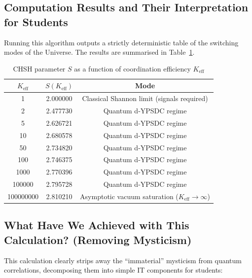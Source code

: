 \documentclass[12pt,a4paper]{article}
\begin{document}
	\subsection{Computation Results and Their Interpretation for Students}
	
	Running this algorithm outputs a strictly deterministic table of the switching modes of the Universe. The results are summarised in Table~\ref{tab:bell_yuct}.
	
	\begin{table}[htbp]
		\centering
		\small
		\setlength{\tabcolsep}{4pt}
		\caption{CHSH parameter \(S\) as a function of coordination efficiency \(K_{\mathrm{eff}}\)}
		\label{tab:bell_yuct}
		\begin{tabular}{ccc}
			\toprule
			\(K_{\mathrm{eff}}\) & \(S(K_{\mathrm{eff}})\) & Mode \\
			\midrule
			1            & 2.000000 & Classical Shannon limit (signals required) \\
			2            & 2.477730 & Quantum d‑YPSDC regime \\
			5            & 2.626721 & Quantum d‑YPSDC regime \\
			10           & 2.680578 & Quantum d‑YPSDC regime \\
			50           & 2.734820 & Quantum d‑YPSDC regime \\
			100          & 2.746375 & Quantum d‑YPSDC regime \\
			1000         & 2.770396 & Quantum d‑YPSDC regime \\
			100000       & 2.795728 & Quantum d‑YPSDC regime \\
			100000000    & 2.810210 & Asymptotic vacuum saturation (\(K_{\mathrm{eff}} \to \infty\)) \\
			\bottomrule
		\end{tabular}
	\end{table}
	
	\subsection{What Have We Achieved with This Calculation? (Removing Mysticism)}
	
	This calculation clearly strips away the ``immaterial'' mysticism from quantum correlations, decomposing them into simple IT components for students:
	
\end{document}
